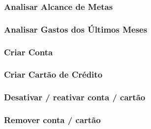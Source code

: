 \documentclass[a4paper]{abnt}
\begin{document}
\subsubsection{Analisar Alcance de Metas}
\subsubsection{Analisar Gastos dos Últimos Meses}
\subsubsection{Criar Conta}
\subsubsection{Criar Cart\~ao de Crédito}
\subsubsection{Desativar / reativar conta / cartão}
\subsubsection{Remover conta / cartão}
\end{document}
